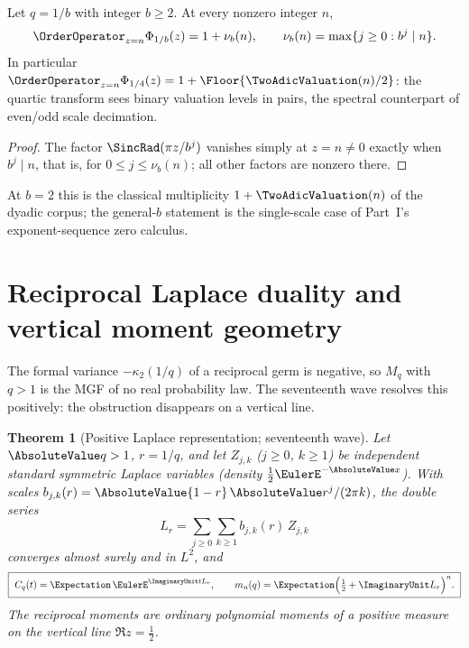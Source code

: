\documentclass[11pt,oneside]{article}
\numberwithin{equation}{section}
\newtheorem{theorem}{Theorem}[section]
\theoremstyle{definition}
\theoremstyle{remark}
\begin{document}
\begin{proposition}
\label{p7:prop:base-b-zero}
Let $q=1/b$ with integer $b\ge2$.  At every nonzero integer $n$,
\begin{equation}\label{p7:eq:base-b-zero}
 \OrderOperator_{z=n}\Phi_{1/b}(z)=1+\nu_b(n),
 \qquad
 \nu_b(n)=\max\{j\ge0:b^j\mid n\}.
\end{equation}
In particular $\OrderOperator_{z=n}\Phi_{1/4}(z)=1+\Floor{\TwoAdicValuation(n)/2}$: the quartic
transform sees binary valuation levels in pairs, the spectral counterpart of
even/odd scale decimation.
\end{proposition}

\begin{proof}
The factor $\SincRad(\pi z/b^j)$ vanishes simply at $z=n\ne0$ exactly when
$b^j\mid n$, that is, for $0\le j\le\nu_b(n)$; all other factors are nonzero
there.
\end{proof}

At $b=2$ this is the classical multiplicity $1+\TwoAdicValuation(n)$ of the dyadic
corpus; the general-$b$ statement is the single-scale case of Part~I's
exponent-sequence zero calculus.
\section{Reciprocal Laplace duality and vertical moment geometry}
\label{p7:sec:laplace-dual}

The formal variance $-\kappa_2(1/q)$ of a reciprocal germ is negative, so
$M_q$ with $q>1$ is the MGF of no real probability law.  The seventeenth wave
resolves this positively: the obstruction disappears on a vertical line.

\begin{theorem}[Positive Laplace representation; seventeenth wave]
\label{p7:thm:laplace-dual}
Let $\AbsoluteValue q>1$, $r=1/q$, and let $Z_{j,k}$ ($j\ge0$, $k\ge1$) be independent
standard symmetric Laplace variables (density $\tfrac12\EulerE^{-\AbsoluteValue x}$).  With
scales $b_{j,k}(r)=\AbsoluteValue{1-r}\,\AbsoluteValue r^j/(2\pi k)$, the double series
\begin{equation}\label{p7:eq:Lr}
 L_{r}=\sum_{j\ge0}\sum_{k\ge1}b_{j,k}(r)\,Z_{j,k}
\end{equation}
converges almost surely and in $L^2$, and
\begin{equation}\label{p7:eq:C-laplace}
 \boxed{\ C_q(t)=\Expectation\,\EulerE^{\ImaginaryUnit tL_{r}},
 \qquad
 m_n(q)=\Expectation\Bigl(\tfrac12+\ImaginaryUnit L_{r}\Bigr)^{n}.\ }
\end{equation}
The reciprocal moments are ordinary polynomial moments of a positive measure
on the vertical line $\Re z=\tfrac12$.
\end{theorem}
\end{document}
